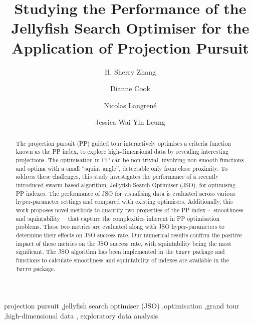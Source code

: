\documentclass[
  number,
  preprint,
  3p]{elsarticle}
\begin{document}
\begin{frontmatter}
\title{Studying the Performance of the Jellyfish Search Optimiser for
the Application of Projection Pursuit}
\author[1]{H. Sherry Zhang%
%
}
\author[2]{Dianne Cook%
%
}
\author[3]{Nicolas Langrené%
%
}
\author[2]{Jessica Wai Yin Leung%
%
}






        
\begin{abstract}
The projection pursuit (PP) guided tour interactively optimises a
criteria function known as the PP index, to explore high-dimensional
data by revealing interesting projections. The optimisation in PP can be
non-trivial, involving non-smooth functions and optima with a small
``squint angle'', detectable only from close proximity. To address these
challenges, this study investigates the performance of a recently
introduced swarm-based algorithm, Jellyfish Search Optimiser (JSO), for
optimising PP indexes. The performance of JSO for visualising data is
evaluated across various hyper-parameter settings and compared with
existing optimisers. Additionally, this work proposes novel methods to
quantify two properties of the PP index --~smoothness and
squintability~-- that capture the complexities inherent in PP
optimisation problems. These two metrics are evaluated along with JSO
hyper-parameters to determine their effects on JSO success rate. Our
numerical results confirm the positive impact of these metrics on the
JSO success rate, with squintability being the most significant. The JSO
algorithm has been implemented in the \texttt{tourr} package and
functions to calculate smoothness and squintability of indexes are
available in the \texttt{ferrn} package.
\end{abstract}





\begin{keyword}
    projection pursuit \sep jellyfish search optimiser
(JSO) \sep optimisation \sep grand tour \sep high-dimensional data \sep 
    exploratory data analysis
\end{keyword}
\end{frontmatter}
    
\end{document}
